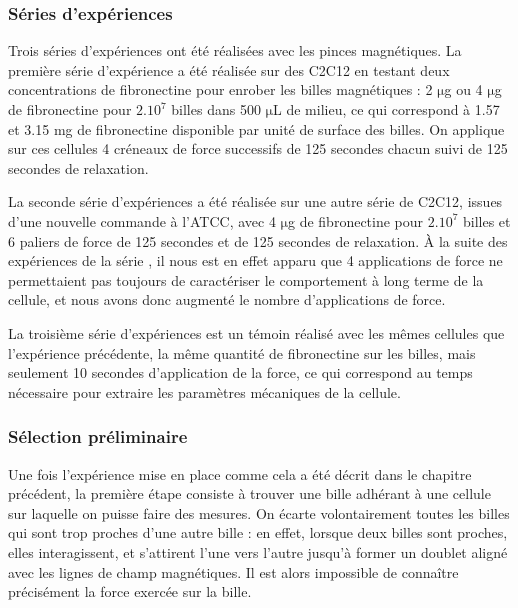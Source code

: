 \documentclass{report}
\newcommand{\micro}{$\mathrm{\mu}$}
\begin{document}
\subsubsection{Séries d'expériences}

Trois séries d'expériences ont été réalisées avec les pinces magnétiques.
La première série d'expérience a été réalisée sur des C2C12 en testant deux concentrations de fibronectine pour enrober les billes magnétiques : 2 \micro g ou  4 \micro g de fibronectine pour $2.10^7$ billes dans 500 \micro L de milieu, ce qui correspond à 1.57 et 3.15 mg de fibronectine disponible par unité de surface des billes.  
On applique sur ces cellules 4 créneaux de force successifs de 125 secondes chacun suivi de 125 secondes de relaxation. 

La seconde série d'expériences a été réalisée sur une autre série de C2C12, issues d'une nouvelle commande à l'ATCC, avec 4 \micro g de fibronectine pour $2.10^7$ billes et 6 paliers de force de 125 secondes et de 125 secondes de relaxation. 
À la suite des expériences de la série , il nous est en effet apparu que 4 applications de force ne permettaient pas toujours de caractériser le comportement à long terme de la cellule, et nous avons donc augmenté le nombre d'applications de force. 

La troisième série d'expériences est un témoin réalisé avec les mêmes cellules que l'expérience précédente, la même quantité de fibronectine sur les billes, mais seulement 10 secondes d'application de la force, ce qui correspond au temps nécessaire pour extraire les paramètres mécaniques de la cellule. 




\subsubsection{Sélection préliminaire}

Une fois l'expérience mise en place comme cela a été décrit dans le chapitre précédent, la première étape consiste à trouver une bille adhérant à une cellule sur laquelle on puisse faire des mesures. 
On écarte volontairement toutes les billes qui sont trop proches d'une autre bille : en effet, lorsque deux billes sont proches, elles interagissent, et s'attirent l'une vers l'autre jusqu'à former un doublet aligné avec les lignes de champ magnétiques. Il est alors impossible de connaître précisément la force exercée sur la bille. 
\end{document}
